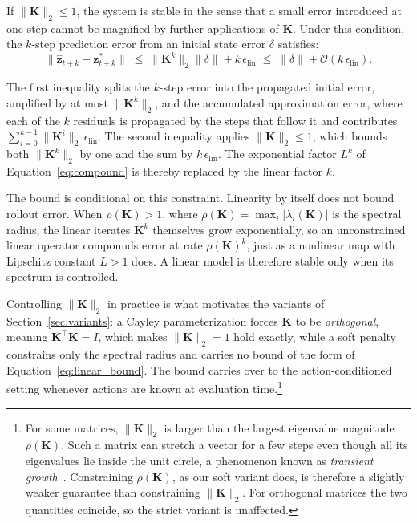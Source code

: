 \documentclass[10pt]{article} %
\newcommand{\K}{\mathbf{K}}
\newcommand{\z}{\bm{z}}
\begin{document}
If $\|\K\|_2 \le 1$, the system is stable in the sense that a small error introduced at one step cannot be magnified by further applications of $\K$. Under this condition, the $k$-step prediction error from an initial state error $\delta$ satisfies:
\begin{equation}
    \|\hat{\z}_{t+k} - \z^*_{t+k}\|
    \;\leq\; \|\mathbf{K}^k\|_2 \|\delta\| + k\,\epsilon_\text{lin}
    \;\leq\; \|\delta\| + \mathcal{O}(k\,\epsilon_\text{lin}).
    \label{eq:linear_bound}
\end{equation}

The first inequality splits the $k$-step error into the propagated initial error, amplified by at most $\|\K^k\|_2$, and the accumulated approximation error, where each of the $k$ residuals is propagated by the steps that follow it and contributes $\sum_{i=0}^{k-1}\|\K^i\|_2\,\epsilon_\text{lin}$. The second inequality applies $\|\K\|_2 \le 1$, which bounds both $\|\K^k\|_2$ by one and the sum by $k\,\epsilon_\text{lin}$. The exponential factor $L^k$ of Equation~\ref{eq:compound} is thereby replaced by the linear factor $k$.

The bound is conditional on this constraint. Linearity by itself does not bound rollout error. When $\rho(\K) > 1$, where $\rho(\K) = \max_i |\lambda_i(\K)|$ is the spectral radius, the linear iterates $\K^k$ themselves grow exponentially, so an unconstrained linear operator compounds error at rate $\rho(\K)^k$, just as a nonlinear map with Lipschitz constant $L > 1$ does. A linear model is therefore stable only when its spectrum is controlled.

Controlling $\|\K\|_2$ in practice is what motivates the variants of Section~\ref{sec:variants}: a Cayley parameterization forces $\K$ to be \emph{orthogonal}, meaning $\K^\top\K = I$, which makes $\|\K\|_2 = 1$ hold exactly, while a soft penalty constrains only the spectral radius and carries no bound of the form of Equation~\ref{eq:linear_bound}. The bound carries over to the action-conditioned setting whenever actions are known at evaluation time.\footnote{For some matrices, $\|\K\|_2$ is larger than the largest eigenvalue magnitude $\rho(\K)$. Such a matrix can stretch a vector for a few steps even though all its eigenvalues lie inside the unit circle, a phenomenon known as \emph{transient growth}~\citep{trefethen2005spectra}. Constraining $\rho(\K)$, as our soft variant does, is therefore a slightly weaker guarantee than constraining $\|\K\|_2$. For orthogonal matrices the two quantities coincide, so the strict variant is unaffected.}
\end{document}
